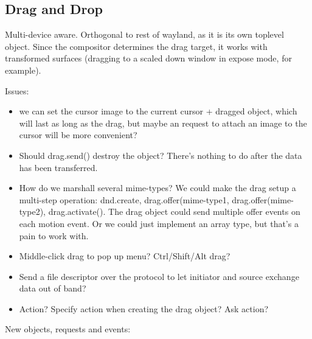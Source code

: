 \documentclass{article}
\begin{document}
\subsection{Drag and Drop}

Multi-device aware. Orthogonal to rest of wayland, as it is its own
toplevel object.  Since the compositor determines the drag target, it
works with transformed surfaces (dragging to a scaled down window in
expose mode, for example).

Issues: 

\begin{itemize}
\item we can set the cursor image to the current cursor + dragged
  object, which will last as long as the drag, but maybe an request to
  attach an image to the cursor will be more convenient?

\item Should drag.send() destroy the object?  There's nothing to do
  after the data has been transferred.

\item How do we marshall several mime-types?  We could make the drag
  setup a multi-step operation: dnd.create, drag.offer(mime-type1,
  drag.offer(mime-type2), drag.activate().  The drag object could send
  multiple offer events on each motion event.  Or we could just
  implement an array type, but that's a pain to work with.

\item Middle-click drag to pop up menu?  Ctrl/Shift/Alt drag?

\item Send a file descriptor over the protocol to let initiator and
  source exchange data out of band?

\item Action?  Specify action when creating the drag object? Ask
  action?
\end{itemize}

New objects, requests and events:
\end{document}
